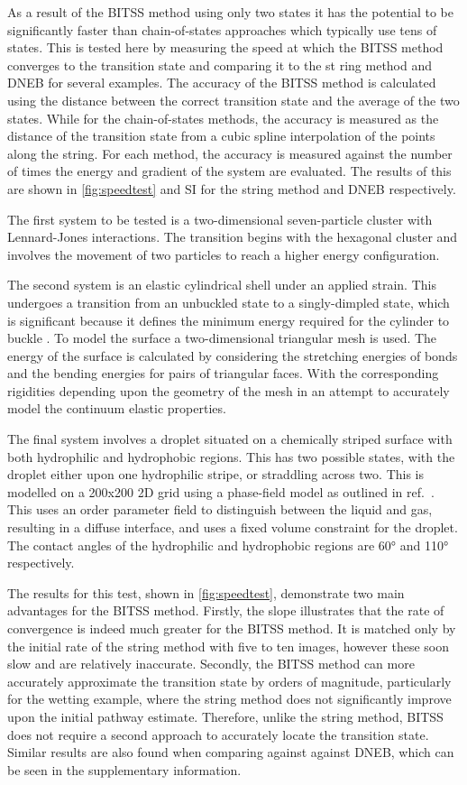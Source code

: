 \documentclass[aps,twocolumn]{revtex4}
\newcommand{\ccite}[1]{ref.~\cite{#1}}
\newcommand{\temp}[1]{{\leavevmode\color{red}#1}}
\begin{document}
As a result of the BITSS method using only two states it has the potential to be significantly faster than chain-of-states approaches which typically use tens of states. This is tested here by measuring the speed at which the BITSS method converges to the transition state and comparing it to the st	ring method and DNEB for several examples. The accuracy of the BITSS method is calculated using the distance between the correct transition state and the average of the two states. While for the chain-of-states methods, the accuracy is measured as the distance of the transition state from a cubic spline interpolation of the points along the string. For each method, the accuracy is measured against the number of times the energy and gradient of the system are evaluated. The results of this are shown in \cref{fig:speedtest} and \temp{SI} for the string method and DNEB respectively.

The first system to be tested is a two-dimensional seven-particle cluster with Lennard-Jones interactions. The transition begins with the hexagonal cluster and involves the movement of two particles to reach a higher energy configuration.

The second system is an elastic cylindrical shell under an applied strain. This undergoes a transition from an unbuckled state to a singly-dimpled state, which is significant because it defines the minimum energy required for the cylinder to buckle \cite{Panter2019}. To model the surface a two-dimensional triangular mesh is used. The energy of the surface is calculated by considering the stretching energies of bonds and the bending energies for pairs of triangular faces. With the corresponding rigidities depending upon the geometry of the mesh in an attempt to accurately model the continuum elastic properties.

The final system involves a droplet situated on a chemically striped surface with both hydrophilic and hydrophobic regions. This has two possible states, with the droplet either upon one hydrophilic stripe, or straddling across two. This is modelled on a 200x200 2D grid using a phase-field model as outlined in \ccite{Panter2019b}. This uses an order parameter field to distinguish between the liquid and gas, resulting in a diffuse interface, and uses a fixed volume constraint for the droplet. The contact angles of the hydrophilic and hydrophobic regions are 60\si{\degree} and 110\si{\degree} respectively.

The results for this test, shown in \cref{fig:speedtest}, demonstrate two main advantages for the BITSS method. Firstly, the slope illustrates that the rate of convergence is indeed much greater for the BITSS method. It is matched only by the initial rate of the string method with five to ten images, however these soon slow and are relatively inaccurate. Secondly, the BITSS method can more accurately approximate the transition state by orders of magnitude, particularly for the wetting example, where the string method does not significantly improve upon the initial pathway estimate. Therefore, unlike the string method, BITSS does not require a second approach to accurately locate the transition state. Similar results are also found when comparing against against DNEB, which can be seen in the supplementary information.
\end{document}
